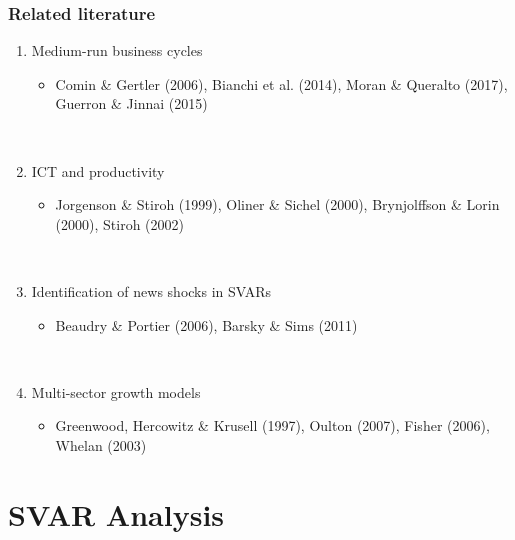 \documentclass{beamer}
\begin{document}
\begin{frame}
	\frametitle{Related literature}
	
	\begin{enumerate}
	\item Medium-run business cycles 
		\begin{itemize}
		\item Comin \& Gertler (2006), Bianchi et al. (2014), Moran \& Queralto (2017), Guerron \& Jinnai (2015)
		\end{itemize}

	
	\
	
	\item ICT and productivity 
		\begin{itemize}
		\item Jorgenson \& Stiroh (1999), Oliner \& Sichel (2000),  Brynjolffson \& Lorin (2000), Stiroh (2002) %
		\end{itemize}
	
	\
	
	\item Identification of news shocks in SVARs
		\begin{itemize}
		\item Beaudry \& Portier (2006), Barsky \& Sims (2011)
		\end{itemize}
	
	\
	
	\item Multi-sector growth models
		\begin{itemize}
		\item Greenwood, Hercowitz \& Krusell (1997), Oulton (2007), Fisher (2006), Whelan (2003)
		\end{itemize}
	\end{enumerate}

	
\end{frame}

\section{SVAR Analysis}
\end{document}
